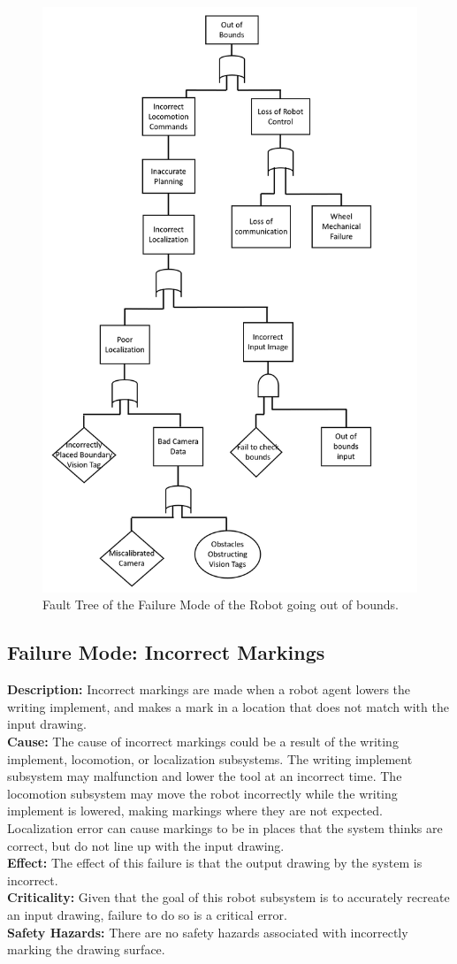 \begin{figure}
 \centering
 \includegraphics[width=0.65\columnwidth]{figs/fault_table_bounds.png}
 \caption{Fault Tree of the Failure Mode of the Robot going out of bounds.}
 \label{fig:out_of_bounds_failure}
\end{figure}
\clearpage

\subsection{Failure Mode: Incorrect Markings}
\label{sec:sys_val_fm_markings}
\textbf{Description:} Incorrect markings are made when a robot agent lowers the writing implement, and makes a mark in a location that does not match with the input drawing. \\
\textbf{Cause:} The cause of incorrect markings could be a result of the writing implement, locomotion, or localization subsystems. The writing implement subsystem may malfunction and lower the tool at an incorrect time. The locomotion subsystem may move the robot incorrectly while the writing implement is lowered, making markings where they are not expected. Localization error can cause markings to be in places that the system thinks are correct, but do not line up with the input drawing.\\
\textbf{Effect:} The effect of this failure is that the output drawing by the system is incorrect.\\
\textbf{Criticality:} Given that the goal of this robot subsystem is to accurately recreate an input drawing, failure to do so is a critical error.\\
\textbf{Safety Hazards:} There are no safety hazards associated with incorrectly marking the drawing surface.

